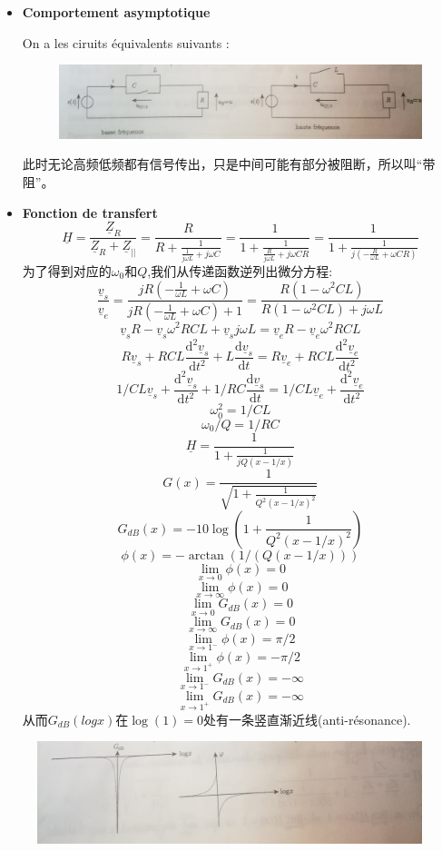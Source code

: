 \documentclass[12pt]{book}
\theoremstyle{definition}\newtheorem{dfn}{Définition}[chapter]
\theoremstyle{plain}\newtheorem{thm}{Théorème}[chapter]
\theoremstyle{plain}\newtheorem{prp}{Proposition}[chapter]
\theoremstyle{plain}\newtheorem{lem}{\bf Lemme}[chapter]
\theoremstyle{plain}\newtheorem{axm}{\bf Axiome}[chapter]
\theoremstyle{plain}\newtheorem{lmm}{\bf Lemme}[chapter]
\theoremstyle{plain}\newtheorem{cor}{\bf Corollaire}[chapter]
\theoremstyle{remark}\newtheorem{rem}{Remarque}[chapter]
\begin{document}
\begin{itemize}
	\item \textbf{Comportement asymptotique}
	
	On a les ciruits équivalents suivants :
	\begin{figure}[H]
		\centering
		\includegraphics[scale=0.16]{Filtrage//9}
	\end{figure}
此时无论高频低频都有信号传出，只是中间可能有部分被阻断，所以叫“带阻”。



\item \textbf{Fonction de transfert}
$$
\underline{H}=\frac{\underline{Z}_R}{\underline{Z}_R+\underline{Z}_{||}}=\frac{R}{R+\frac{1}{\frac{1}{j\omega L}+j\omega C}}=\frac{1}{1+\frac{1}{\frac{R}{j\omega L}+j\omega CR}}=\frac{1}{1+\frac{1}{j(-\frac{R}{\omega L}+\omega CR)}}
$$
为了得到对应的$\omega_0$和$Q$,我们从传递函数逆列出微分方程:
$$
\frac{\underline{v}_s}{\underline{v}_e}=\frac{jR(-\frac{1}{\omega L}+\omega C)}{jR(-\frac{1}{\omega L}+\omega C)+1}=\frac{R(1-\omega^2 CL)}{R(1-\omega^2 CL)+j\omega L}
$$
$$
\underline{v}_sR-\underline{v}_s\omega^2 RCL+\underline{v}_sj\omega L=\underline{v}_eR-\underline{v}_e\omega^2 RCL
$$
$$
R\underline{v}_s+RCL\frac{\mathrm{d^2}\underline{v}_s}{\mathrm{d}t^2}+L\frac{\mathrm{d}\underline{v}_s}{\mathrm{d}t}=R\underline{v}_e+RCL\frac{\mathrm{d^2}\underline{v}_e}{\mathrm{d}t^2}
$$
$$
1/CL\underline{v}_s+\frac{\mathrm{d^2}\underline{v}_s}{\mathrm{d}t^2}+1/RC\frac{\mathrm{d}\underline{v}_s}{\mathrm{d}t}=1/CL\underline{v}_e+\frac{\mathrm{d^2}\underline{v}_e}{\mathrm{d}t^2}
$$
$$\omega_0^2=1/CL$$
$$\omega_0/Q=1/RC$$
$$\boxed{  \underline{H}=\frac{1}{1+\frac{1}{jQ(x-1/x)}}}  $$
$$
G(x)=\frac{1}{\sqrt{1+\frac{1}{Q^2(x-1/x)^2}}}
$$
$$
G_{dB}(x)=-10\log(1+\frac{1}{Q^2(x-1/x)^2})
$$
$$
\phi(x)=-\arctan(1/(Q(x-1/x)))
$$
$$
\lim\limits_{x\to0}\phi(x)=0
$$
$$
\lim\limits_{x\to\infty}\phi(x)=0
$$
$$
\lim\limits_{x\to0}G_{dB}(x)=0
$$
$$
\lim\limits_{x\to\infty}G_{dB}(x)=0
$$
$$
\lim\limits_{x\to1^{-}}\phi(x)=\pi/2
$$
$$
\lim\limits_{x\to1^{+}}\phi(x)=-\pi/2
$$
$$
\lim\limits_{x\to1^{-}}G_{dB}(x)=-\infty
$$
$$
\lim\limits_{x\to1^{+}}G_{dB}(x)=-\infty
$$
从而$G_{dB}(logx)$在$\log(1)=0$处有一条竖直渐近线(anti-résonance).
\end{itemize}
\begin{figure}[H]
	\centering
	\includegraphics[scale=0.15]{Filtrage//10}
\end{figure}
\end{document}
